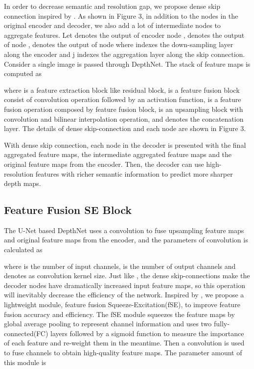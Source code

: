 \documentclass[letterpaper]{article} \usepackage{aaai21}  \usepackage{times}  \usepackage{helvet} \usepackage{courier}  \usepackage[hyphens]{url}  \usepackage{graphicx} \urlstyle{rm} \def\UrlFont{\rm}  \usepackage{natbib}  \usepackage{caption} \frenchspacing  \setlength{\pdfpagewidth}{8.5in}  \setlength{\pdfpageheight}{11in}  \usepackage{booktabs}
\begin{document}
In order to decrease semantic and resolution gap, we propose dense skip connection inspired by \cite{zhou2018unet++}. As shown in Figure 3, in addition to the nodes in the original encoder and decoder,
we also add a lot of intermediate nodes to aggregate features. Let  denotes the output of encoder node ,  denotes the output of node ,
 denotes the output of node  where  indexes the down-sampling layer along the encoder and j indexes the aggregation layer along the skip connection. Consider a single image  is
passed through DepthNet. The stack of feature maps is computed as



where  is a feature extraction block like residual block,  is a feature fusion block consist of convolution operation followed by an activation function,  is a feature
fusion operation composed by feature fusion block,  is an upsampling block with convolution and bilinear interpolation operation, and  denotes
the concatenation layer. The details of dense skip-connection and each node are shown in Figure 3.

With dense skip connection, each node in the decoder is presented with the final aggregated feature maps, the intermediate aggregated feature maps and the original
feature maps from the encoder. Then, the decoder can use high-resolution features with richer semantic information to predict more sharper depth maps.

\subsection{Feature Fusion SE Block}
The U-Net based DepthNet uses a  convolution to fuse upsampling feature maps and original feature maps from the encoder, and the parameters of convolution is calculated as

where  is the number of input channels,  is the number of output channels and  denotes as convolution kernel size.
Just like \cite{huang2017densely}, the dense skip-connections make the decoder nodes have dramatically increased input feature maps, so this operation will inevitably decrease the efficiency of the network. 
Inspired by \cite{hu2019squeeze-and-excitation}, we propose a lightweight module, feature fusion Squeeze-Excitation(fSE), to improve feature fusion accuracy and efficiency. The fSE module squeezes
the feature maps by global average pooling to represent channel information and uses two fully-connected(FC) layers followed by a sigmoid function to measure the importance of each feature and re-weight
them in the meantime. Then a  convolution is used to fuse channels to obtain high-quality feature maps. The parameter amount of this module is
\end{document}
